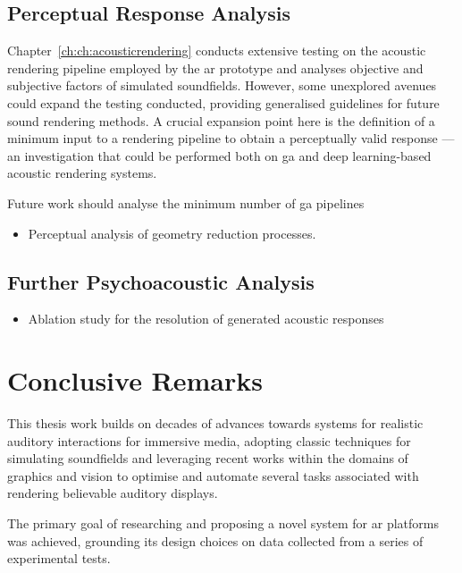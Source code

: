 \subsection{Perceptual Response Analysis}
Chapter~\ref{ch:ch:acousticrendering} conducts extensive testing on the acoustic rendering pipeline employed by the \acrshort{ar} prototype and analyses objective and subjective factors of simulated soundfields. However, some unexplored avenues could expand the testing conducted, providing generalised guidelines for future sound rendering methods. A crucial expansion point here is the definition of a minimum input to a rendering pipeline to obtain a perceptually valid response --- an investigation that could be performed both on \acrshort{ga} and deep learning-based acoustic rendering systems.\par
Future work should analyse the minimum number of  \acrshort{ga} pipelines

\begin{itemize}
    \item Perceptual analysis of geometry reduction processes.
\end{itemize}

\subsection{Further Psychoacoustic Analysis}


\begin{itemize}
    \item Ablation study for the resolution of generated acoustic responses
\end{itemize}

\section{Conclusive Remarks}
This thesis work builds on decades of advances towards systems for realistic auditory interactions for immersive media, adopting classic techniques for simulating soundfields and leveraging recent works within the domains of graphics and vision to optimise and automate several tasks associated with rendering believable auditory displays.\par
The primary goal of researching and proposing a novel system for \acrshort{ar} platforms was achieved, grounding its design choices on data collected from a series of experimental tests.